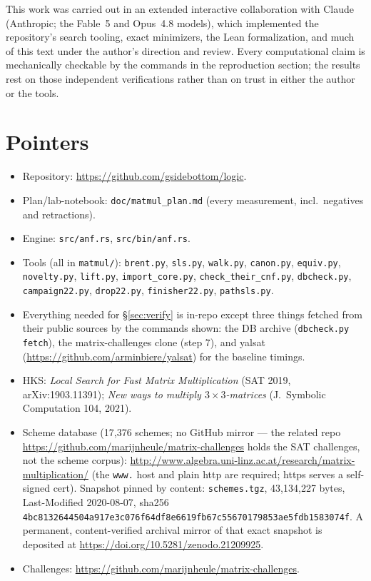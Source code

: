 \documentclass[10pt]{article}
\begin{document}
This work was carried out in an extended interactive collaboration
with Claude (Anthropic; the Fable~5 and Opus~4.8 models), which
implemented the repository's search tooling, exact minimizers, the
Lean formalization, and much of this text under the author's
direction and review. Every computational claim is mechanically
checkable by the commands in the reproduction section; the results
rest on those independent verifications rather than on trust in
either the author or the tools.

\section{Pointers}\label{sec:pointers}

\begin{itemize}
\item Repository: \url{https://github.com/gsidebottom/logic}.
\item Plan/lab-notebook: \texttt{doc/matmul\_plan.md} (every
  measurement, incl.\ negatives and retractions).
\item Engine: \texttt{src/anf.rs}, \texttt{src/bin/anf.rs}.
\item Tools (all in \texttt{matmul/}): \texttt{brent.py},
  \texttt{sls.py}, \texttt{walk.py}, \texttt{canon.py},
  \texttt{equiv.py}, \texttt{novelty.py}, \texttt{lift.py},
  \texttt{import\_core.py}, \texttt{check\_their\_cnf.py},
  \texttt{dbcheck.py}, \texttt{campaign22.py}, \texttt{drop22.py},
  \texttt{finisher22.py}, \texttt{pathsls.py}.
\item Everything needed for \S\ref{sec:verify} is in-repo except three
  things fetched from their public sources by the commands shown: the
  DB archive (\texttt{dbcheck.py fetch}), the matrix-challenges clone
  (step 7), and yalsat (\url{https://github.com/arminbiere/yalsat})
  for the baseline timings.
\item HKS: \emph{Local Search for Fast Matrix Multiplication} (SAT
  2019, arXiv:1903.11391); \emph{New ways to multiply
  $3\times3$-matrices} (J.~Symbolic Computation 104, 2021).
\item Scheme database (17,376 schemes; no GitHub mirror --- the
  related repo \url{https://github.com/marijnheule/matrix-challenges}
  holds the SAT challenges, not the scheme corpus):
  \url{http://www.algebra.uni-linz.ac.at/research/matrix-multiplication/}
  (the \texttt{www.} host and plain http are required; https serves a
  self-signed cert). Snapshot pinned by content: \texttt{schemes.tgz},
  43{,}134{,}227 bytes, Last-Modified 2020-08-07, sha256
  \texttt{4bc8132644504a917e3c076f64df8e6619fb67c55670179853ae5fdb1583074f}.
  A permanent, content-verified archival mirror of that exact snapshot
  is deposited at \url{https://doi.org/10.5281/zenodo.21209925}.
\item Challenges: \url{https://github.com/marijnheule/matrix-challenges}.
\end{itemize}
\end{document}
